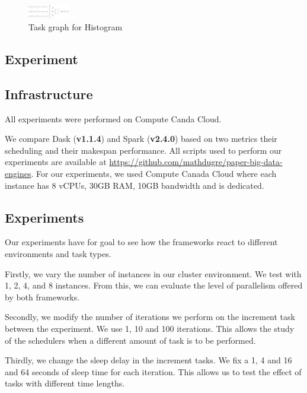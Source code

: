 \documentclass[conference]{IEEEtran}
\begin{document}
\begin{figure}[!t]
    \centering
    \includegraphics[width=0.16\textwidth, angle=-90]{images/histogram-task-graph.png}
    \caption{Task graph for Histogram}\label{fig:tg-histo}
\end{figure}

\subsection{Experiment}

\subsection{Infrastructure}
All experiments were performed on Compute Canda Cloud.



We compare Dask (\textbf{v1.1.4}) and Spark (\textbf{v2.4.0}) based on two metrics
their scheduling and their makespan performance. All scripts used to perform our
experiments are available at
\href{https://github.com/mathdugre/paper-big-data-engines}{https://github.com/mathdugre/paper-big-data-engines}.
For our experiments, we used Compute Canada Cloud where each instance has 8 vCPUs,
30GB RAM, 10GB bandwidth and is dedicated.

\subsection{Experiments}
Our experiments have for goal to see how the frameworks react to different
environments and task types.

Firstly, we vary the number of instances in our cluster environment. We test with 1,
2, 4, and 8 instances. From this, we can evaluate the level of parallelism offered by
both frameworks.

Secondly, we modify the number of iterations we perform on the increment task between
the experiment. We use 1, 10 and 100 iterations. This allows the study of the
schedulers when a different amount of task is to be performed.

Thirdly, we change the sleep delay in the increment tasks. We fix a 1, 4 and 16 and
64 seconds of sleep time for each iteration. This allows us to test the effect of
tasks with different time lengths.
\end{document}
